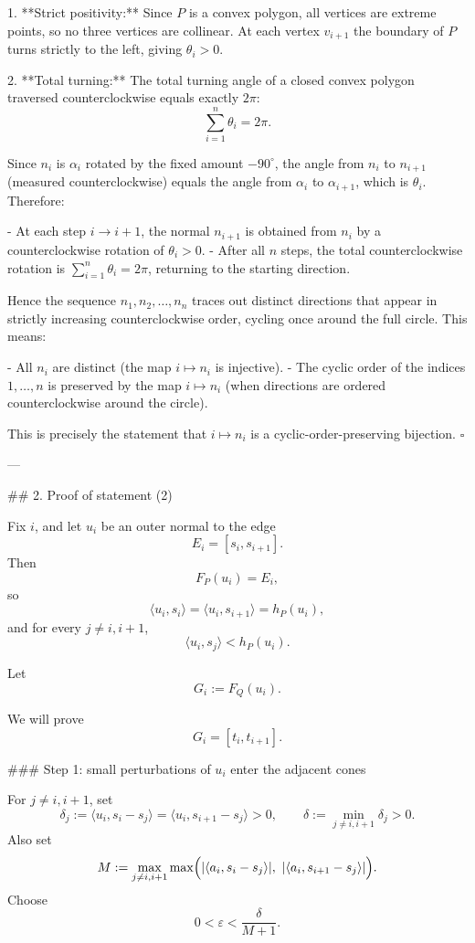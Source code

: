 1. **Strict positivity:** Since \(P\) is a convex polygon, all vertices are extreme points, so no three vertices are collinear. At each vertex \(v_{i+1}\) the boundary of \(P\) turns strictly to the left, giving \(\theta_i>0\).

2. **Total turning:** The total turning angle of a closed convex polygon traversed counterclockwise equals exactly \(2\pi\):
\[
\sum_{i=1}^{n}\theta_i=2\pi.
\]

Since \(n_i\) is \(\alpha_i\) rotated by the fixed amount \(-90^\circ\), the angle from \(n_i\) to \(n_{i+1}\) (measured counterclockwise) equals the angle from \(\alpha_i\) to \(\alpha_{i+1}\), which is \(\theta_i\). Therefore:

- At each step \(i\to i+1\), the normal \(n_{i+1}\) is obtained from \(n_i\) by a counterclockwise rotation of \(\theta_i>0\).
- After all \(n\) steps, the total counterclockwise rotation is \(\sum_{i=1}^n\theta_i=2\pi\), returning to the starting direction.

Hence the sequence \(n_1,n_2,\dots,n_n\) traces out distinct directions that appear in strictly increasing counterclockwise order, cycling once around the full circle. This means:

- All \(n_i\) are distinct (the map \(i\mapsto n_i\) is injective).
- The cyclic order of the indices \(1,\dots,n\) is preserved by the map \(i\mapsto n_i\) (when directions are ordered counterclockwise around the circle).

This is precisely the statement that \(i\mapsto n_i\) is a cyclic-order-preserving bijection.
\(\square\)

---

## 2. Proof of statement (2)

Fix \(i\), and let \(u_i\) be an outer normal to the edge
\[
E_i=[s_i,s_{i+1}].
\]
Then
\[
F_P(u_i)=E_i,
\]
so
\[
\langle u_i,s_i\rangle=\langle u_i,s_{i+1}\rangle=h_P(u_i),
\]
and for every \(j\neq i,i+1\),
\[
\langle u_i,s_j\rangle<h_P(u_i).
\]

Let
\[
G_i:=F_Q(u_i).
\]

We will prove
\[
G_i=[t_i,t_{i+1}].
\]

### Step 1: small perturbations of \(u_i\) enter the adjacent cones

For \(j\neq i,i+1\), set
\[
\delta_j:=\langle u_i,s_i-s_j\rangle=\langle u_i,s_{i+1}-s_j\rangle>0,
\qquad
\delta:=\min_{j\neq i,i+1}\delta_j>0.
\]
Also set
\[
M:=\max_{j\neq i,i+1}\max\Bigl(
|\langle a_i,s_i-s_j\rangle|,\ |\langle a_i,s_{i+1}-s_j\rangle|
\Bigr).
\]
Choose
\[
0<\varepsilon<\frac{\delta}{M+1}.
\]

